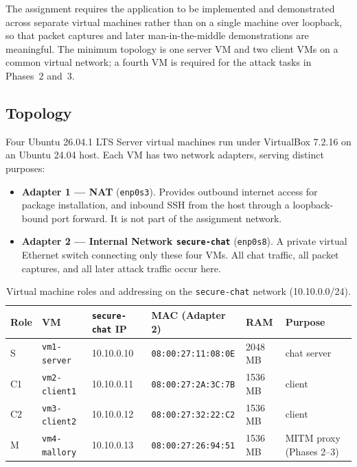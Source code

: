 \documentclass[11pt,a4paper]{article}
\begin{document}
The assignment requires the application to be implemented and demonstrated across separate virtual
machines rather than on a single machine over loopback, so that packet captures and later
man-in-the-middle demonstrations are meaningful. The minimum topology is one server VM and two
client VMs on a common virtual network; a fourth VM is required for the attack tasks in Phases~2
and~3.

\subsection{Topology}

Four Ubuntu 26.04.1 LTS Server virtual machines run under VirtualBox 7.2.16 on an Ubuntu 24.04 host.
Each VM has two network adapters, serving distinct purposes:

\begin{itemize}
  \item \textbf{Adapter 1 --- NAT} (\texttt{enp0s3}). Provides outbound internet access for package
        installation, and inbound SSH from the host through a loopback-bound port forward. It is not
        part of the assignment network.
  \item \textbf{Adapter 2 --- Internal Network \texttt{secure-chat}} (\texttt{enp0s8}). A private
        virtual Ethernet switch connecting only these four VMs. All chat traffic, all packet
        captures, and all later attack traffic occur here.
\end{itemize}

\begin{table}[htbp]
\centering
\small
\begin{tabular}{@{}llllll@{}}
\toprule
\textbf{Role} & \textbf{VM} & \textbf{\texttt{secure-chat} IP} & \textbf{MAC (Adapter 2)} & \textbf{RAM} & \textbf{Purpose} \\
\midrule
S  & \texttt{vm1-server}  & 10.10.0.10 & \texttt{08:00:27:11:08:0E} & 2048\,MB & chat server \\
C1 & \texttt{vm2-client1} & 10.10.0.11 & \texttt{08:00:27:2A:3C:7B} & 1536\,MB & client \\
C2 & \texttt{vm3-client2} & 10.10.0.12 & \texttt{08:00:27:32:22:C2} & 1536\,MB & client \\
M  & \texttt{vm4-mallory} & 10.10.0.13 & \texttt{08:00:27:26:94:51} & 1536\,MB & MITM proxy (Phases 2--3) \\
\bottomrule
\end{tabular}
\caption{Virtual machine roles and addressing on the \texttt{secure-chat} network (10.10.0.0/24).}
\end{table}
\end{document}
